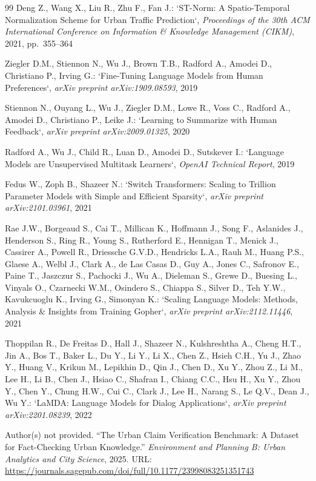 \documentclass[a4paper,fleqn]{cas-sc}
\begin{document}
\begin{thebibliography}{99}
Deng Z., Wang X., Liu R., Zhu F., Fan J.:  
`ST-Norm: A Spatio-Temporal Normalization Scheme for Urban Traffic Prediction`, \textit{Proceedings of the 30th ACM International Conference on Information \& Knowledge Management (CIKM)}, 2021, pp.~355--364

Ziegler D.M., Stiennon N., Wu J., Brown T.B., Radford A., Amodei D., Christiano P., Irving G.:  
`Fine-Tuning Language Models from Human Preferences`, \textit{arXiv preprint arXiv:1909.08593}, 2019

Stiennon N., Ouyang L., Wu J., Ziegler D.M., Lowe R., Voss C., Radford A., Amodei D., Christiano P., Leike J.:  
`Learning to Summarize with Human Feedback`, \textit{arXiv preprint arXiv:2009.01325}, 2020

Radford A., Wu J., Child R., Luan D., Amodei D., Sutskever I.:  
`Language Models are Unsupervised Multitask Learners`, \textit{OpenAI Technical Report}, 2019

Fedus W., Zoph B., Shazeer N.:  
`Switch Transformers: Scaling to Trillion Parameter Models with Simple and Efficient Sparsity`, \textit{arXiv preprint arXiv:2101.03961}, 2021

Rae J.W., Borgeaud S., Cai T., Millican K., Hoffmann J., Song F., Aslanides J., Henderson S., Ring R., Young S., Rutherford E., Hennigan T., Menick J., Cassirer A., Powell R., Driessche G.V.D., Hendricks L.A., Rauh M., Huang P.S., Glaese A., Welbl J., Clark A., de Las Casas D., Guy A., Jones C., Safronov E., Paine T., Jaszczur S., Pachocki J., Wu A., Dieleman S., Grewe D., Buesing L., Vinyals O., Czarnecki W.M., Osindero S., Chiappa S., Silver D., Teh Y.W., Kavukcuoglu K., Irving G., Simonyan K.:  
`Scaling Language Models: Methods, Analysis \& Insights from Training Gopher`, \textit{arXiv preprint arXiv:2112.11446}, 2021

Thoppilan R., De Freitas D., Hall J., Shazeer N., Kulshreshtha A., Cheng H.T., Jin A., Bos T., Baker L., Du Y., Li Y., Li X., Chen Z., Hsieh C.H., Yu J., Zhao Y., Huang V., Krikun M., Lepikhin D., Qin J., Chen D., Xu Y., Zhou Z., Li M., Lee H., Li B., Chen J., Hsiao C., Shafran I., Chiang C.C., Hsu H., Xu Y., Zhou Y., Chen Y., Chung H.W., Cui C., Clark J., Lee H., Narang S., Le Q.V., Dean J., Wu Y.:  
`LaMDA: Language Models for Dialog Applications`, \textit{arXiv preprint arXiv:2201.08239}, 2022

Author(s) not provided.  
``The Urban Claim Verification Benchmark: A Dataset for Fact-Checking Urban Knowledge.''  
\textit{Environment and Planning B: Urban Analytics and City Science}, 2025.  
URL: \url{https://journals.sagepub.com/doi/full/10.1177/23998083251351743}


\end{thebibliography}
\end{document}
